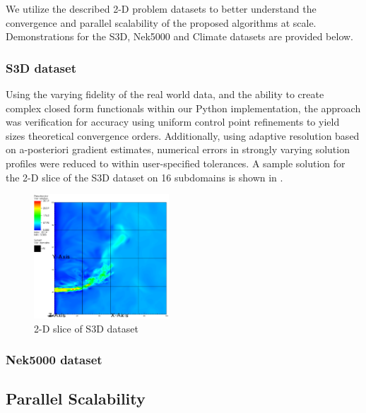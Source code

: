 We utilize the described 2-D problem datasets to better understand the convergence and parallel scalability of the proposed algorithms at scale. Demonstrations for the S3D, Nek5000 and Climate datasets are provided below.

\subsubsection{S3D dataset}
Using the varying fidelity of the real world data, and the ability to create complex closed form functionals within our Python implementation, the approach was verification for accuracy using uniform control point refinements to yield sizes theoretical convergence orders. Additionally, using adaptive resolution based on a-posteriori gradient estimates, numerical errors in strongly varying solution profiles were reduced to within user-specified tolerances. A sample solution for the 2-D slice of the S3D dataset on 16 subdomains is shown in .

\begin{figure}
	\includegraphics[width=0.45\textwidth]{figures/s3d-2d-profile.png}
	\caption{2-D slice of S3D dataset}
	\label{fig:s3d-adaptive-2d}
\end{figure}


\subsubsection{Nek5000 dataset}




\subsection{Parallel Scalability}\label{sec:parallel-scalability}

